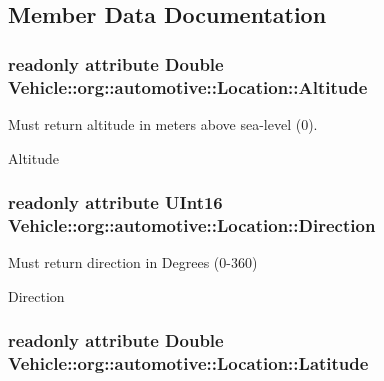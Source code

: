 \subsection{Member Data Documentation}
\hypertarget{interfaceVehicle_1_1org_1_1automotive_1_1Location_aacfa07466cfe32a663506f3171523ee7}{
\subsubsection[{Altitude}]{\setlength{\rightskip}{0pt plus 5cm}readonly attribute Double Vehicle\-::org\-::automotive\-::\-Location\-::\-Altitude}}\label{interfaceVehicle_1_1org_1_1automotive_1_1Location_aacfa07466cfe32a663506f3171523ee7}


Must return altitude in meters above sea-\/level (0). 

Altitude \hypertarget{interfaceVehicle_1_1org_1_1automotive_1_1Location_ad21a6330593354e621d2462733286e72}{
\subsubsection[{Direction}]{\setlength{\rightskip}{0pt plus 5cm}readonly attribute U\-Int16 Vehicle\-::org\-::automotive\-::\-Location\-::\-Direction}}\label{interfaceVehicle_1_1org_1_1automotive_1_1Location_ad21a6330593354e621d2462733286e72}


Must return direction in Degrees (0-\/360) 

Direction \hypertarget{interfaceVehicle_1_1org_1_1automotive_1_1Location_a2e58af2d4ca65b89a5f33c23fd011db3}{
\subsubsection[{Latitude}]{\setlength{\rightskip}{0pt plus 5cm}readonly attribute Double Vehicle\-::org\-::automotive\-::\-Location\-::\-Latitude}}\label{interfaceVehicle_1_1org_1_1automotive_1_1Location_a2e58af2d4ca65b89a5f33c23fd011db3}


